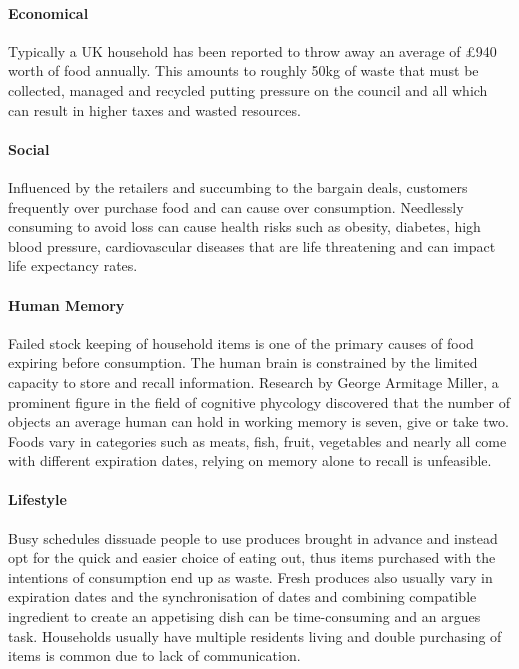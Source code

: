 \documentclass[a4paper, 11pt]{article}
\begin{document}
\paragraph{Economical}Typically a UK household has been reported to throw away an average of \pounds940 worth of food annually. This amounts to roughly 50kg of waste that must be collected, managed and recycled putting pressure on the council and all which can result in higher taxes and wasted resources.

\paragraph{Social} Influenced by the retailers and succumbing to the bargain deals, customers frequently over purchase food and can cause over consumption. Needlessly consuming to avoid loss can cause health risks such as obesity, diabetes, high blood pressure, cardiovascular diseases that are life threatening and can impact life expectancy rates. 

\paragraph{Human Memory} Failed stock keeping of household items is one of the primary causes of food expiring before consumption. The human brain is constrained by the limited capacity to store and recall information. Research by George Armitage Miller, a prominent figure in the field of cognitive phycology discovered that the number of objects an average human can hold in working memory is seven, give or take two.\cite{2} Foods vary in categories such as meats, fish, fruit, vegetables and nearly all come with different expiration dates, relying on memory alone to recall is unfeasible. 

\paragraph{Lifestyle} Busy schedules dissuade people to use produces brought in advance and instead opt for the quick and easier choice of eating out, thus items purchased with the intentions of consumption end up as waste. Fresh produces also usually vary in expiration dates and the synchronisation of dates and combining compatible ingredient to create an appetising dish can be time-consuming and an argues task. Households usually have multiple residents living and double purchasing of items is common due to lack of communication. 

\vspace{\baselineskip}
\vspace{\baselineskip}
\vspace{\baselineskip}
\end{document}
